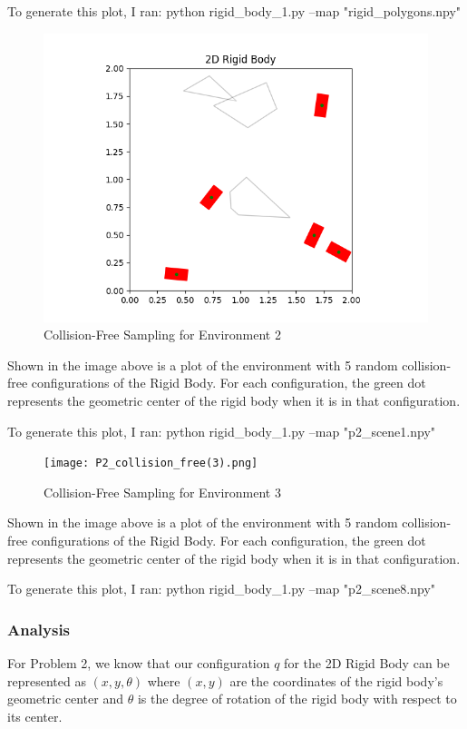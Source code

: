 \documentclass{article}
\begin{document}
To generate this plot, I ran: \newline 
python rigid\_body\_1.py --map "rigid\_polygons.npy"


\newpage 
\begin{figure}[h!]
	\includegraphics[width= 0.9 \linewidth]{P2_collision_free(2).png}
	\centering
	\caption{Collision-Free Sampling for Environment 2}
	\label{P2_collision_free(2).png}
\end{figure}
Shown in the image above is a plot of the environment with 5 random collision-free configurations of the Rigid Body. For each configuration, the green dot represents the geometric center of the rigid body when it is in that configuration. 

To generate this plot, I ran: \newline 
python rigid\_body\_1.py --map "p2\_scene1.npy"


\newpage 
\begin{figure}[h!]
	\texttt{[image: P2\_collision\_free(3).png]}
	\centering
	\caption{Collision-Free Sampling for Environment 3}
	\label{P2_collision_free(3).png}
\end{figure}
Shown in the image above is a plot of the environment with 5 random collision-free configurations of the Rigid Body. For each configuration, the green dot represents the geometric center of the rigid body when it is in that configuration. 

To generate this plot, I ran: \newline 
python rigid\_body\_1.py --map "p2\_scene8.npy"



\newpage 
\subsubsection{Analysis}
For Problem 2, we know that our configuration $q$ for the 2D Rigid Body can be represented as $(x, y, \theta)$ where $(x, y)$ are the coordinates of the rigid body's geometric center and $\theta$ is the degree of rotation of the rigid body with respect to its center. 
\end{document}
